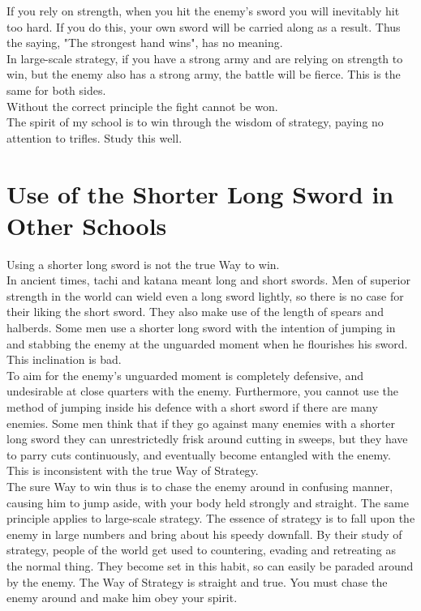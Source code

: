If you rely on strength, when you hit the enemy's sword you will inevitably hit too hard. If you do this, your own sword will be carried along as a result. Thus the saying, "The strongest hand wins", has no meaning.\\

In large-scale strategy, if you have a strong army and are relying on strength to win, but the enemy also has a strong army, the battle will be fierce. This is the same for both sides.\\

Without the correct principle the fight cannot be won.\\

The spirit of my school is to win through the wisdom of strategy, paying no attention to trifles. Study this well.\\
\section{Use of the Shorter Long Sword in Other Schools}

Using a shorter long sword is not the true Way to win.\\

In ancient times, tachi and katana meant long and short swords. Men of superior strength in the world can wield even a long sword lightly, so there is no case for their liking the short sword. They also make use of the length of spears and halberds. Some men use a shorter long sword with the intention of jumping in and stabbing the enemy at the unguarded moment when he flourishes his sword. This inclination is bad.\\

To aim for the enemy's unguarded moment is completely defensive, and undesirable at close quarters with the enemy. Furthermore, you cannot use the method of jumping inside his defence with a short sword if there are many enemies. Some men think that if they go against many enemies with a shorter long sword they can unrestrictedly frisk around cutting in sweeps, but they have to parry cuts continuously, and eventually become entangled with the enemy. This is inconsistent with the true Way of Strategy.\\

The sure Way to win thus is to chase the enemy around in confusing manner, causing him to jump aside, with your body held strongly and straight. The same principle applies to large-scale strategy. The essence of strategy is to fall upon the enemy in large numbers and bring about his speedy downfall. By their study of strategy, people of the world get used to countering, evading and retreating as the normal thing. They become set in this habit, so can easily be paraded around by the enemy. The Way of Strategy is straight and true. You must chase the enemy around and make him obey your spirit.\\
